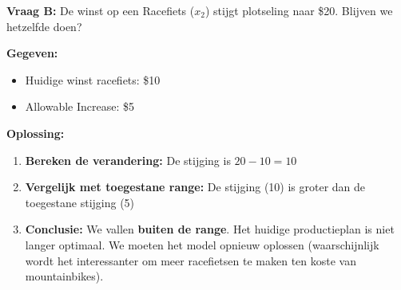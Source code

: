 \documentclass[a4paper,11pt]{article}
\begin{document}
\begin{oefenblok}[title=Oefening 1: Verandering in Winstmarges]
    \vspace{5mm}
    
    \textbf{Vraag B:} De winst op een Racefiets ($x_2$) stijgt plotseling naar \$20. Blijven we hetzelfde doen?
    
    \textbf{Gegeven:}
    \begin{itemize}
        \item Huidige winst racefiets: \$10
        \item Allowable Increase: \$5
    \end{itemize}
    
    \textbf{Oplossing:}
    \begin{enumerate}
        \item \textbf{Bereken de verandering:} De stijging is $20 - 10 = 10$
        \item \textbf{Vergelijk met toegestane range:} 
        De stijging (10) is groter dan de toegestane stijging (5)
        \item \textbf{Conclusie:} We vallen \textbf{buiten de range}. Het huidige productieplan is niet langer optimaal. 
        We moeten het model opnieuw oplossen (waarschijnlijk wordt het interessanter om meer racefietsen te maken ten koste van mountainbikes).
    \end{enumerate}
\end{oefenblok}
\end{document}

